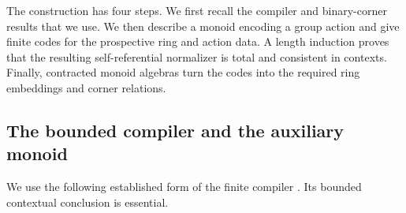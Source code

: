 The construction has four steps. We first recall the compiler and
binary-corner results that we use. We then describe a monoid encoding
a group action and give finite codes for the prospective ring and
action data. A length induction proves that the resulting
self-referential normalizer is total and consistent in contexts.
Finally, contracted monoid algebras turn the codes into the required
ring embeddings and corner relations.

\subsection{The bounded compiler and the auxiliary monoid}

We use the following established form of the finite compiler
\citep[Lemma~7.1, Bounded Compiler Lemma]{FoundationsCompanion}.
Its bounded contextual
conclusion is essential.

